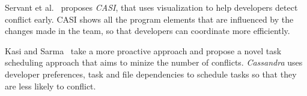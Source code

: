 Servant et al.~\cite{servant_casi:_2010} proposes \emph{CASI}, that uses visualization to help developers detect conflict early.
CASI shows all the program elements that are influenced by the changes made in the team, so that developers can coordinate more efficiently.

Kasi and Sarma~\cite{kasi_cassandra:_2013} take a more proactive approach and propose a novel task scheduling approach that aims to minize the number of conflicts. 
\emph{Cassandra} uses developer preferences, task and file dependencies to schedule tasks so that they are less likely to conflict.
